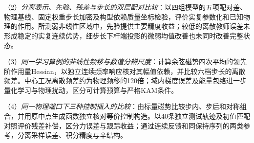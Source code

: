 \noindent（2）\emph{分离表示、先验、残差与步长的双层配对比较}：以四组模型的五项配对差、物理基线、固定权重步长加密及构型依赖质量坐标检验，评价实复参数化和已知物理的作用。所测弱非线性区域中，先验提供主要精度收益；较低的离散教师误差未形成稳定的实复连续优势，细步长下杆端投影的微弱均值改善也未同时改善完整状态。

\noindent（3）\emph{同一学习算例的非线性频移与数值分辨尺度}：计算余弦磁势四次平均的领先阶作用量Hessian，以独立连续频率响应核对其幅值依赖，并比较六档步长的离散频差。中心工况离散频差约为物理频移的120倍；域内梯度误差及能量包络进一步量化学习与物理扰动，区分可计算预算与严格KAM条件。

\noindent（4）\emph{同一物理端口下三种控制插入的比较}：由标量磁势比较步内、步后和对称组合，并用原中点生成函数独立核对等价控制构造。以40条独立测试轨迹及初值匹配对照评价残差补偿，区分力误差与跟踪收益；通过连续反馈和同保持序列的两类参考，分离采样误差、积分精度与辛结构。
